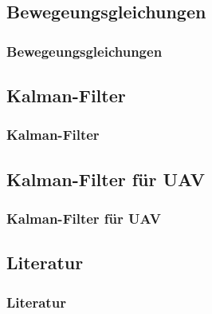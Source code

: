 \documentclass[10pt,a4paper,oneside]{beamer}
\begin{document}
\begin{frame}
  \section{Bewegeungsgleichungen}
  \frametitle{Bewegeungsgleichungen}
\end{frame}


\begin{frame}
  \section{Kalman-Filter}
  \frametitle{Kalman-Filter}
\end{frame}

\begin{frame}
  \section{Kalman-Filter für UAV}
  \frametitle{Kalman-Filter für UAV}
\end{frame}

\begin{frame}
  \section{Literatur}
  \frametitle{Literatur}
\printbibliography

\end{frame}
\end{document}
